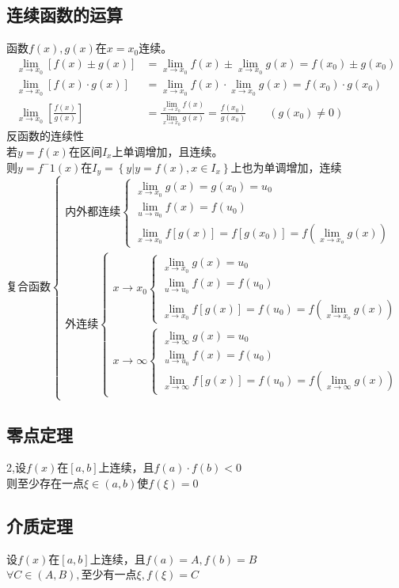 \subsection{连续函数的运算}
函数$f(x),g(x)$在$x=x_0$连续。
\begin{displaymath}
    \begin{split}
        \lim\limits_{x\to x_0}\left[f(x)\pm g(x)\right]&=\lim\limits_{x\to x_0}f(x)\pm \lim\limits_{x\to x_0}g(x)=f(x_0)\pm g(x_0)\\
        \lim\limits_{x\to x_0}\left[f(x)\cdot g(x)\right]&=\lim\limits_{x\to x_0}f(x)\cdot \lim\limits_{x\to x_0}g(x)=f(x_0)\cdot g(x_0)\\
        \lim\limits_{x\to x_0}\left[\frac{f(x)}{g(x)}\right]&=\frac{\lim\limits_{x\to x_0}f(x)}{\lim\limits_{x\to x_0}g(x)}=\frac{f(x_0)}{g(x_0)}\qquad \left(g(x_0)\neq 0\right)
    \end{split}
\end{displaymath}
反函数的连续性\\
若$y=f(x)$在区间$I_x$上单调增加，且连续。\\
则$y=f^-1(x)$在$I_y=\left\{y|y=f(x),x\in I_x\right\}$上也为单调增加，连续\\
$$\mbox{复合函数}\begin{cases}
    \mbox{内外都连续}\begin{cases}
    \lim\limits_{x\to x_0}g(x)=g(x_0)=u_0\\
    \lim\limits_{u\to u_0}f(x)=f(u_0)\\
    \lim\limits_{x\to x_0}f\left[g(x)\right]=f\left[g(x_0)\right]=f(\lim\limits_{x\to x_o}g(x))
\end{cases}\\
    \mbox{外连续}\begin{cases}
        x\rightarrow x_0\begin{cases}
        \lim\limits_{x\to x_0}g(x)=u_0\\
        \lim\limits_{u\to u_0}f(x)=f(u_0)\\
        \lim\limits_{x\to x_0}f\left[g(x)\right]=f(u_0)=f(\lim\limits_{x\to x_o}g(x))
    \end{cases}\\
        x\rightarrow \infty\begin{cases}
            \lim\limits_{x\to \infty}g(x)=u_0\\
            \lim\limits_{u\to u_0}f(x)=f(u_0)\\
            \lim\limits_{x\to \infty}f\left[g(x)\right]=f(u_0)=f(\lim\limits_{x\to \infty}g(x))
        \end{cases}
    \end{cases}
\end{cases}$$
\subsection{零点定理}
2,设$f(x)$在$\left[a,b\right]$上连续，且$f(a)\cdot f(b)<0$\\
则至少存在一点$\xi \in \left(a,b\right)$使$f(\xi)=0$
\subsection{介质定理}
设$f(x)$在$\left[a,b\right]$上连续，且$f(a)=A,f(b)=B$\\
$\forall C\in\left(A,B\right),$至少有一点$\xi,f(\xi)=C$

